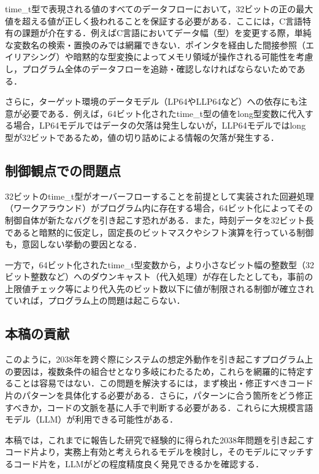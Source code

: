 \documentclass[submit,techrep,noauthor]{ipsj}
\begin{document}
time\_t型で表現される値のすべてのデータフローにおいて，32ビットの正の最大値を超える値が正しく扱われることを保証する必要がある．ここには，C言語特有の課題が介在する．例えばC言語においてデータ幅（型）を変更する際，単純な変数名の検索・置換のみでは網羅できない．ポインタを経由した間接参照（エイリアシング）や暗黙的な型変換によってメモリ領域が操作される可能性を考慮し，プログラム全体のデータフローを追跡・確認しなければならないためである．

さらに，ターゲット環境のデータモデル（LP64やLLP64など）への依存にも注意が必要である．例えば，64ビット化されたtime\_t型の値をlong型変数に代入する場合，LP64モデルではデータの欠落は発生しないが，LLP64モデルではlong型が32ビットであるため，値の切り詰めによる情報の欠落が発生する．

\subsection{制御観点での問題点}

32ビットのtime\_t型がオーバーフローすることを前提として実装された回避処理（ワークアラウンド）がプログラム内に存在する場合，64ビット化によってその制御自体が新たなバグを引き起こす恐れがある．また，時刻データを32ビット長であると暗黙的に仮定し，固定長のビットマスクやシフト演算を行っている制御も，意図しない挙動の要因となる．

一方で，64ビット化されたtime\_t型変数から，より小さなビット幅の整数型（32ビット整数など）へのダウンキャスト（代入処理）が存在したとしても，事前の上限値チェック等により代入先のビット数以下に値が制限される制御が確立されていれば，プログラム上の問題は起こらない．

\subsection{本稿の貢献}

このように，2038年を跨ぐ際にシステムの想定外動作を引き起こすプログラム上の要因は，複数条件の組合せとなり多岐にわたるため，これらを網羅的に特定することは容易ではない．この問題を解決するには，まず検出・修正すべきコード片のパターンを具体化する必要がある．さらに，パターンに合う箇所をどう修正すべきか，コードの文脈を基に人手で判断する必要がある．これらに大規模言語モデル（LLM）が利用できる可能性がある．

本稿では，これまでに報告した研究で経験的に得られた2038年問題を引き起こすコード片より，実務上有効と考えられるモデルを検討し，そのモデルにマッチするコード片を，LLMがどの程度精度良く発見できるかを確認する．
\end{document}
